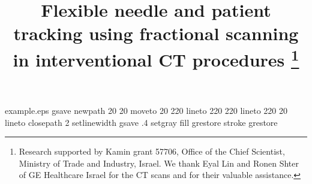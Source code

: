 %
%
%
%
%
\begin{filecontents*}{example.eps}
gsave
newpath
  20 20 moveto
  20 220 lineto
  220 220 lineto
  220 20 lineto
closepath
2 setlinewidth
gsave
  .4 setgray fill
grestore
stroke
grestore
\end{filecontents*}
%
\RequirePackage{fix-cm}
%
\documentclass{svjour3}                     %
%
\smartqed  %
%
\usepackage{graphicx}
\usepackage{enumitem}
\usepackage{float}
\usepackage{subfig}
\usepackage{cite}
\usepackage{url}
\usepackage{spreadtab}
\usepackage{algorithm,algorithmic}
\usepackage{amsmath}
\usepackage[numbers]{natbib}

\DeclareMathOperator*{\argmin}{argmin} %
\DeclareMathOperator*{\myint}{int} %
%
%
%
%
%


\title{Flexible needle and patient tracking using fractional scanning in interventional CT procedures
\thanks{Research supported by Kamin grant 57706, Office of the Chief Scientist, Ministry of Trade and Industry, Israel. We thank Eyal Lin and Ronen Shter of GE Healthcare Israel for the CT scans and for their valuable assistance.}%
}

